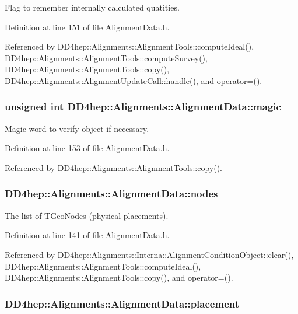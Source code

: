 Flag to remember internally calculated quatities. 

Definition at line 151 of file AlignmentData.h.

Referenced by DD4hep::Alignments::AlignmentTools::computeIdeal(), DD4hep::Alignments::AlignmentTools::computeSurvey(), DD4hep::Alignments::AlignmentTools::copy(), DD4hep::Alignments::AlignmentUpdateCall::handle(), and operator=().\hypertarget{class_d_d4hep_1_1_alignments_1_1_alignment_data_a52652c8211546dca391a248a6f4c422a}{
\subsubsection[{magic}]{\setlength{\rightskip}{0pt plus 5cm}unsigned int {\bf DD4hep::Alignments::AlignmentData::magic}}}
\label{class_d_d4hep_1_1_alignments_1_1_alignment_data_a52652c8211546dca391a248a6f4c422a}


Magic word to verify object if necessary. 

Definition at line 153 of file AlignmentData.h.

Referenced by DD4hep::Alignments::AlignmentTools::copy().\hypertarget{class_d_d4hep_1_1_alignments_1_1_alignment_data_ae7f0952d17a85f1061aa0b2967aff0ab}{
\subsubsection[{nodes}]{ {\bf DD4hep::Alignments::AlignmentData::nodes}}}
\label{class_d_d4hep_1_1_alignments_1_1_alignment_data_ae7f0952d17a85f1061aa0b2967aff0ab}


The list of TGeoNodes (physical placements). 

Definition at line 141 of file AlignmentData.h.

Referenced by DD4hep::Alignments::Interna::AlignmentConditionObject::clear(), DD4hep::Alignments::AlignmentTools::computeIdeal(), DD4hep::Alignments::AlignmentTools::copy(), and operator=().\hypertarget{class_d_d4hep_1_1_alignments_1_1_alignment_data_a0da8f92652a64d0ca69a1c884bd5b034}{
\subsubsection[{placement}]{ {\bf DD4hep::Alignments::AlignmentData::placement}}}
\label{class_d_d4hep_1_1_alignments_1_1_alignment_data_a0da8f92652a64d0ca69a1c884bd5b034}


